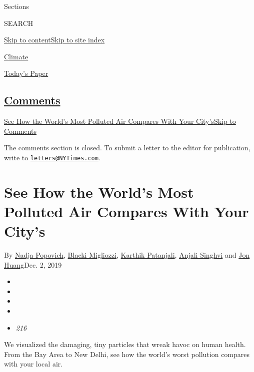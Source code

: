 Sections

SEARCH

\protect\hyperlink{site-content}{Skip to
content}\protect\hyperlink{site-index}{Skip to site index}

\href{https://www.nytimes3xbfgragh.onion/section/climate}{Climate}

\href{https://myaccount.nytimes3xbfgragh.onion/auth/login?response_type=cookie\&client_id=vi}{}

\href{https://www.nytimes3xbfgragh.onion/section/todayspaper}{Today's
Paper}

\hypertarget{comments}{%
\subsection{\texorpdfstring{\protect\hyperlink{commentsContainer}{Comments}}{Comments}}\label{comments}}

\href{}{See How the World's Most Polluted Air Compares With Your
City's}\href{}{Skip to Comments}

The comments section is closed. To submit a letter to the editor for
publication, write to
\href{mailto:letters@NYTimes.com}{\nolinkurl{letters@NYTimes.com}}.

\hypertarget{see-how-the-worlds-most-polluted-air-compares-with-your-citys}{%
\section{See How the World's Most Polluted Air Compares With Your
City's}\label{see-how-the-worlds-most-polluted-air-compares-with-your-citys}}

By \href{https://www.nytimes3xbfgragh.onion/by/nadja-popovich}{Nadja
Popovich},
\href{https://www.nytimes3xbfgragh.onion/by/blacki-migliozzi}{Blacki
Migliozzi},
\href{https://www.nytimes3xbfgragh.onion/by/karthik-patanjali}{Karthik
Patanjali},
\href{https://www.nytimes3xbfgragh.onion/by/anjali-singhvi}{Anjali
Singhvi} and \href{https://www.nytimes3xbfgragh.onion/by/jon-huang}{Jon
Huang}Dec. 2, 2019

\begin{itemize}
\item
\item
\item
\item
\item
  \emph{216}
\end{itemize}

We visualized the damaging, tiny particles that wreak havoc on human
health. From the Bay Area to New Delhi, see how the world's worst
pollution compares with your local air.

